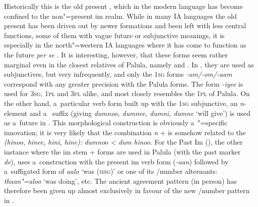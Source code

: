 Historically this is the old present , which in the modern language has become confined to the non"=present im realm. While in many IA languages the old present has been driven out by newer formations and been left with less central functions, some of them with vague future or subjunctive meanings, it is especially in the north"=western IA languages where it has come to function as the future \textit{per se} \citep[288]{masica1991}. It is interesting, however, that these forms seem rather marginal even in the closest relatives of Palula, namely  and . In , they are used as subjunctives, but very infrequently, and only the \textsc{1sg} forms \textit{-um/-om/-aam} correspond with any greater precision with the Palula forms. The form \textit{-iyee} is used for \textsc{3sg}, \textsc{1pl} and \textsc{3pl} alike, and most closely resembles the \textsc{1pl} of Palula. On the other hand, a~particular verb form built up with the \textsc{1sg} subjunctive, an \textit{n}-element and a~ suffix (giving \textit{dumnoo, dumnee, dumni, dumne} `will give') is used as a~future in . This morphological construction is obviously a~"=specific innovation; it is very likely that the combination \textit{n} +  is somehow related to the  \textit{(hinoo, hinee, hini, hine):} \textit{dumnoo {\textless} dum hinoo}. For the Past Im (), the other instance where the im stem +  forms are used in Palula (with the past  marker \textit{de}),  uses a~construction with the present im verb form (\textit{-aan}) followed by a~suffigated form of \textit{aalo} `was \textsc{(msg)}' or one of its /number alternants: \textit{thaan"=aloo} `was doing', etc. The ancient agreement pattern (in person) has therefore been given up almost exclusively in favour of the new /number pattern in  \citep[46--54]{buddruss1967}.



